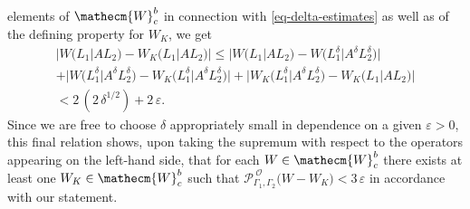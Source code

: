 \documentclass[11pt,twoside,openright]{report}
\theoremstyle{definition}
\theoremstyle{plain}
\theoremstyle{remark}
\theoremstyle{assumption}
\newcommand{\babs}[1]{\bigl\lvert #1 \bigr\rvert}
\newcommand{\bPOGx}[1]{\mathcal{P}_{\Gamma_1 , \Gamma_2}^{\;
    \mathscr{O}} \bigl( #1 \bigr)}
\newcommand{\bWx}[2]{W \bigl( #1 \big\vert #2 \bigr)}
\newcommand{\bWxK}[2]{W_K \bigl( #1 \big\vert #2 \bigr)}
\newcommand{\Wecm}{\mathecm{W}}
\begin{document}
elements of $\Wecm_c^b$ in connection with \eqref{eq-delta-estimates}
as well as of the defining property for $W_K$, we get
\begin{multline}
  \label{eq-conv-weights-precompact}
  \babs{\bWx{L_1}{A L_2} - \bWxK{L_1}{A L_2}} \leqslant
  \babs{\bWx{L_1}{A L_2} - \bWx{L_1^\delta}{A^\delta L_2^\delta}} \\
  + \babs{\bWx{L_1^\delta}{A^\delta L_2^\delta} -
  \bWxK{L_1^\delta}{A^\delta L_2^\delta}} +
  \babs{\bWxK{L_1^\delta}{A^\delta L_2^\delta} - \bWxK{L_1}{A L_2}} \\
  < 2 \, ( 2 \, \delta^{1 / 2} ) + 2 \, \varepsilon \text{.}
\end{multline}
Since we are free to choose $\delta$ appropriately small in dependence
on a given $\varepsilon > 0$, this final relation shows, upon taking
the supremum with respect to the operators appearing on the left-hand
side, that for each $W \in \Wecm_c^b$ there exists at least one $W_K
\in \Wecm_c^b$ such that $\bPOGx{W - W_K} < 3 \, \varepsilon$ in
accordance with our statement.
\end{document}
